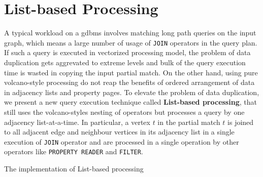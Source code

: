 \section{List-based Processing}
\label{sec:list-based-proc}

A typical workload on a \gls{gdbms} involves matching long path queries on the input graph, which means a large number of usage of \texttt{JOIN} operators in the query plan. If such a query is executed in vectorized processing model, the problem of data duplication gets aggrevated to extreme levels and bulk of the query execution time is wasted in copying the input partial match. On the other hand, using pure volcano-style processing do not reap the benefits of ordered arrangement of data in adjacency lists and property pages. To elevate the problem of data duplication, we present a new query execution technique called \textbf{List-based processing}, that still uses the volcano-styles nesting of operators but processes a query by one adjacency list-at-a-time. In particular, a vertex $t$ in the partial match $t$ is joined to all adjacent edge and neighbour vertices in its adjacency list in a single execution of \texttt{JOIN} operator and are processed in a single operation by other operators like \texttt{PROPERTY READER} and \texttt{FILTER}. 

The implementation of List-based processing 












